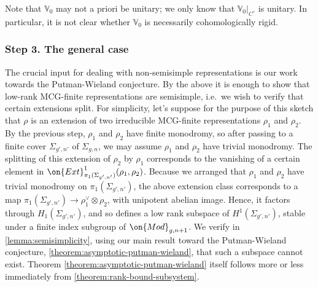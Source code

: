 Note that $\mathbb{V}_0$ may not a priori be unitary; we only know that $\mathbb V_0|_{C^\circ}$ is unitary. In particular, it is not clear whether $\mathbb{V}_0$ is necessarily cohomologically rigid.

\subsubsection{Step 3. The general case}
\label{subsubsection:step-3}
The crucial input for dealing with
non-semisimple representations is our work towards the
Putman-Wieland conjecture. By the above it is enough to show that low-rank
MCG-finite representations are semisimple, i.e.~we wish to verify that certain
extensions split.
For simplicity, let's suppose for the purpose of this sketch that $\rho$ is an extension of two irreducible MCG-finite representations
$\rho_1$ and $\rho_2$.
By the previous step, $\rho_1$ and $\rho_2$ have finite monodromy, so after
passing to a finite cover $\Sigma_{g',n'}$ of $\Sigma_{g,n}$, we may assume
$\rho_1$ and $\rho_2$ have trivial monodromy.
The splitting of this extension of $\rho_2$ by $\rho_1$ corresponds to the vanishing of a certain
element in $\on{Ext}^1_{\pi_1(\Sigma_{g',n'})}(\rho_1, \rho_2)$.
Because we arranged that $\rho_1$ and $\rho_2$ have trivial monodromy
on $\pi_1(\Sigma_{g',n'})$, the above extension class corresponds to a map
$\pi_1(\Sigma_{g',n'}) \to \rho_1^\vee \otimes \rho_2$, with unipotent abelian
image. Hence, it factors through $H_1(\Sigma_{g',n'})$,
and so defines a low rank subspace of $H^1(\Sigma_{g',n'})$, stable under a
finite index subgroup of $\on{Mod}_{g,n+1}$.
We verify in \autoref{lemma:semisimplicity},
using our main result toward the Putman-Wieland conjecture,
\autoref{theorem:asymptotic-putman-wieland},
that such a subspace cannot exist. Theorem \autoref{theorem:asymptotic-putman-wieland} itself follows more or less immediately from \autoref{theorem:rank-bound-subsystem}.


